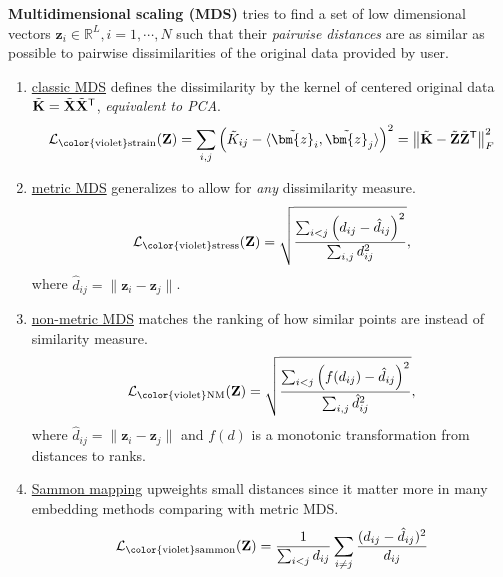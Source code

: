 \textbf{Multidimensional scaling (MDS)} tries to find a set of low dimensional vectors $\bm{z}_i\in\mathbb{R}^L,i=1,\cdots,N$ 
such that their \textit{pairwise distances} are as similar as possible to pairwise dissimilarities of the original data provided by user.
\begin{enumerate}[(1)]
    \item \uline{classic MDS} defines the dissimilarity by the kernel of centered original data $\Tilde{\mathbf{K}}=\Tilde{\mathbf{X}}\Tilde{\mathbf{X}}^\mathsf{T}$, 
    \textit{equivalent to PCA}.
    \begin{gather}
        \mathcal{L}_\text{\color{violet}strain}(\mathbf{Z}) = \sum_{i,j}\left(
            \Tilde{K}_{ij} - \langle\Tilde{\bm{z}}_i,\Tilde{\bm{z}}_j\rangle
        \right)^2
        = \left\|\Tilde{\mathbf{K}}-\Tilde{\mathbf{Z}}\Tilde{\mathbf{Z}}^\mathsf{T}\right\|^2_F
    \end{gather}

    \item \uline{metric MDS} generalizes to allow for \textit{any} dissimilarity measure. 
    \begin{gather}
        \mathcal{L}_\text{\color{violet}stress}(\mathbf{Z}) = \sqrt{\frac{\sum_{i<j}\left(d_{ij}-\hat{d}_{ij}\right)^2}{\sum_{i,j}d_{ij}^2}}, 
    \end{gather}
    where $\hat{d}_{ij}=\|\bm{z}_i-\bm{z}_j\|$.

    \item \uline{non-metric MDS} matches the ranking  of how similar points are instead of similarity measure.
    \begin{gather}
        \mathcal{L}_\text{\color{violet}NM}(\mathbf{Z}) = \sqrt{\frac{\sum_{i<j}\left(f(d_{ij})-\hat{d}_{ij}\right)^2}{\sum_{i,j}\hat{d}_{ij}^2}},
    \end{gather}
    where $\hat{d}_{ij}=\|\bm{z}_i-\bm{z}_j\|$ and $f(d)$ is a monotonic transformation from distances to ranks.

    \item \uline{Sammon mapping} upweights small distances since it matter more in many embedding methods comparing with metric MDS.
    \begin{gather}
        \mathcal{L}_\text{\color{violet}sammon}(\mathbf{Z})=\frac{1}{\sum_{i<j}d_{ij}}\sum_{i\neq j}\frac{(d_{ij}-\hat{d}_{ij})^2}{d_{ij}}
    \end{gather}
\end{enumerate}


